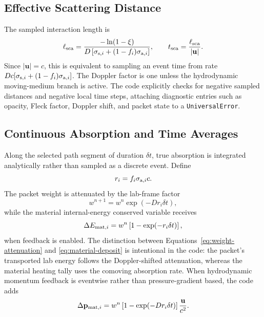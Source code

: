 \documentclass[11pt]{article}
\newcommand{\mom}{\mathbf{p}}
\begin{document}
\subsection{Effective Scattering Distance}

The sampled interaction length is
\begin{equation}
  \ell_{\rm sca}
  =
  \frac{-\ln(1-\xi)}
       {D\,[\sigma_{{\rm s},i}+(1-f_i)\sigma_{{\rm a},i}]},
  \qquad
  t_{\rm sca}=\frac{\ell_{\rm sca}}{|\mathbf{u}|}.
  \label{eq:scattering-distance}
\end{equation}
Since \(|\mathbf{u}|=c\), this is equivalent to sampling an event time from
rate \(D c[\sigma_{{\rm s},i}+(1-f_i)\sigma_{{\rm a},i}]\). The Doppler factor is one unless the
hydrodynamic moving-medium branch is active. The code explicitly checks for
negative sampled distances and negative local time steps, attaching diagnostic
entries such as opacity, Fleck factor, Doppler shift, and packet state to a
\texttt{UniversalError}.

\subsection{Continuous Absorption and Time Averages}

Along the selected path segment of duration \(\delta t\), true absorption is
integrated analytically rather than sampled as a discrete event. Define
\begin{equation}
  r_i = f_i\sigma_{{\rm a},i} c.
\end{equation}
The packet weight is attenuated by the lab-frame factor
\begin{equation}
  w^{n+1} = w^n\exp(-D r_i\delta t),
  \label{eq:weight-attenuation}
\end{equation}
while the material internal-energy conserved variable receives
\begin{equation}
  \Delta E_{{\rm mat},i}
  =
  w^n\left[1-\exp(-r_i\delta t)\right],
  \label{eq:material-deposit}
\end{equation}
when feedback is enabled. The distinction between
Equations~\eqref{eq:weight-attenuation} and \eqref{eq:material-deposit} is
intentional in the code: the packet's transported lab energy follows the
Doppler-shifted attenuation, whereas the material heating tally uses the
comoving absorption rate. When hydrodynamic momentum feedback is eventwise
rather than pressure-gradient based, the code adds
\begin{equation}
  \Delta \mom_{{\rm mat},i}
  =
  w^n\left[1-\exp(-D r_i\delta t)\right]
  \frac{\mathbf{u}}{c^2}.
  \label{eq:momentum-deposit}
\end{equation}
\end{document}
